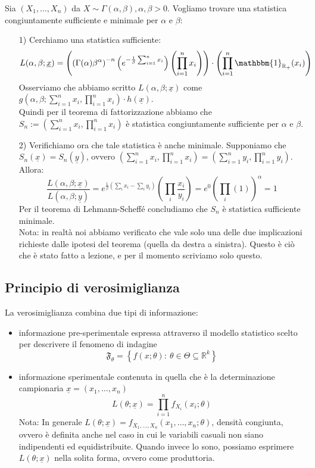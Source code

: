 \begin{esempio} Sia $(X_1,...,X_n)$ da $X \sim \Gamma(\alpha,\beta), \alpha, \beta >0$. Vogliamo trovare una statistica congiuntamente sufficiente e minimale per $\alpha$ e $\beta$:
\begin{enumerate}
\item [1)] Cerchiamo una statistica sufficiente:
$$L(\alpha,\beta;\underline{x}) = \left( \left( \Gamma(\alpha)\beta^{\alpha}\right)^{-n} \left( e^{-\frac{1}{\beta} \sum_{i=1}^n x_i} \right) \left( \prod_{i=1}^n x_i \right) \right) \cdot \left( \prod_{i=1}^n \mathbbm{1}_{\mathbb{R_+}}(x_i) \right)$$
Osserviamo che abbiamo scritto $L(\alpha,\beta;\underline{x})$ come $g \left( \alpha,\beta; \sum_{i=1}^n x_i, \prod_{i=1}^n x_i \right) \cdot h(\underline{x})$.\\
Quindi per il teorema di fattorizzazione abbiamo che $S_n:=\left( \sum_{i=1}^n x_i, \prod_{i=1}^n x_i \right)$ è statistica congiuntamente sufficiente per $\alpha$ e $\beta$.
\item [2)] Verifichiamo ora che tale statistica è anche minimale. Supponiamo che $S_n(\underline{x})=S_n(\underline{y})$, ovvero $\left( \sum_{i=1}^n x_i, \prod_{i=1}^n x_i \right) = \left( \sum_{i=1}^n y_i, \prod_{i=1}^n y_i \right)$. Allora:
$$\frac{L(\alpha,\beta;\underline{x})}{L(\alpha,\beta;\underline{y})} = e^{\frac{1}{\beta} \left( \sum_i x_i - \sum_i y_i \right)} \left( \prod_i \frac{x_i}{y_i} \right) = e^{0} \left( \prod_i (1) \right)^{\alpha} = 1$$
Per il teorema di Lehmann-Scheffé concludiamo che $S_n$ è statistica sufficiente minimale.\\
Nota: in realtà noi abbiamo verificato che vale solo una delle due implicazioni richieste dalle ipotesi del teorema (quella da destra a sinistra). Questo è ciò che è stato fatto a lezione, e per il momento scriviamo solo questo.
\end{enumerate}
\end{esempio}

\subsection{Principio di verosimiglianza}
La verosimiglianza combina due tipi di informazione:
\begin{itemize}
\item informazione pre-sperimentale espressa attraverso il modello statistico scelto per descrivere il fenomeno di indagine
$$\mathfrak{F}_\theta=\left\{f(x;\theta):\ \theta\in\Theta\subseteq\mathbb{R}^k\right\}$$
\item informazione sperimentale contenuta in quella che è la determinazione campionaria $\underline{x}=(x_1,\ldots, x_n)$
$$L(\theta;\underline{x})=\prod_{i=1}^n f_{X_i}(x_i;\theta)$$
Nota: In generale $L(\theta;\underline{x})=f_{X_1,\ldots, X_n}(x_1,\ldots, x_n;\theta)$, densità congiunta, ovvero è definita anche nel caso in cui le variabili casuali non siano indipendenti ed equidistribuite. Quando invece lo sono, possiamo esprimere $L(\theta; \underline{x})$ nella solita forma, ovvero come produttoria.
\end{itemize}


